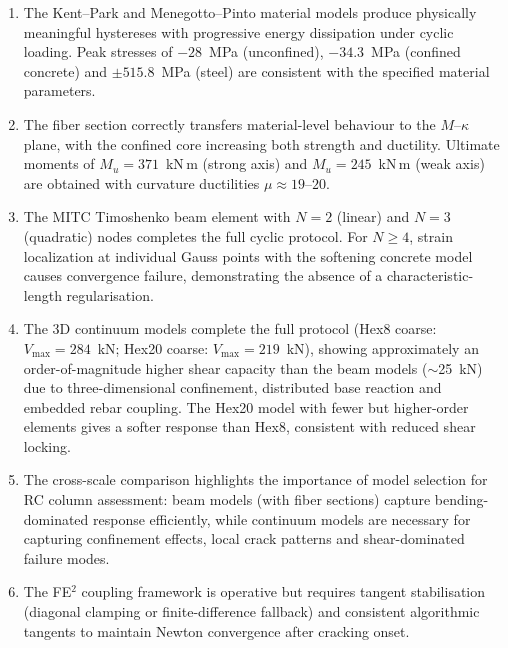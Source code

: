 \begin{enumerate}
  \item The Kent--Park and Menegotto--Pinto material models produce
    physically meaningful hystereses with progressive energy
    dissipation under cyclic loading.  Peak stresses of $-28$~MPa
    (unconfined), $-34.3$~MPa (confined concrete) and $\pm 515.8$~MPa
    (steel) are consistent with the specified material parameters.
  \item The fiber section correctly transfers material-level behaviour
    to the $M$--$\kappa$ plane, with the confined core increasing
    both strength and ductility.  Ultimate moments of $M_u = 371$~kN\,m
    (strong axis) and $M_u = 245$~kN\,m (weak axis) are obtained with
    curvature ductilities $\mu \approx 19$--$20$.
  \item The MITC Timoshenko beam element with $N=2$ (linear) and $N=3$
    (quadratic) nodes completes the full cyclic protocol.  For
    $N \ge 4$, strain localization at individual Gauss points with the
    softening concrete model causes convergence failure, demonstrating
    the absence of a characteristic-length regularisation.
  \item The 3D continuum models complete the full protocol (Hex8
    coarse: $V_\text{max} = 284$~kN; Hex20 coarse: $V_\text{max} = 219$~kN),
    showing approximately an order-of-magnitude higher shear capacity
    than the beam models ($\sim$25~kN) due to three-dimensional
    confinement, distributed base reaction and embedded rebar
    coupling.  The Hex20 model with fewer but higher-order elements
    gives a softer response than Hex8, consistent with reduced
    shear locking.
  \item The cross-scale comparison highlights the importance of model
    selection for RC column assessment: beam models (with fiber
    sections) capture bending-dominated response efficiently, while
    continuum models are necessary for capturing confinement effects,
    local crack patterns and shear-dominated failure modes.
  \item The FE$^2$ coupling framework is operative but requires
    tangent stabilisation (diagonal clamping or finite-difference
    fallback) and consistent algorithmic tangents to maintain
    Newton convergence after cracking onset.
\end{enumerate}
